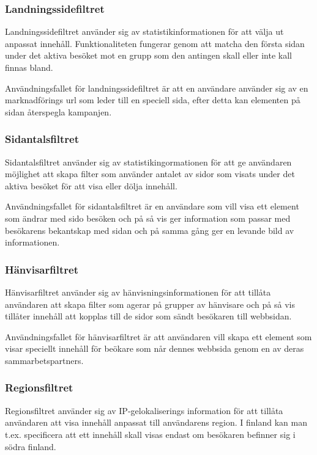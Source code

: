 \subsubsection{Landningssidefiltret}

Landningssidefiltret använder sig av statistikinformationen för att välja ut anpassat innehåll. Funktionaliteten fungerar genom att matcha den första sidan under det aktiva besöket mot en grupp som den antingen skall eller inte kall finnas bland.

Användningsfallet för landningssidefiltret är att en användare använder sig av en marknadförings url som leder till en speciell sida, efter detta kan elementen på sidan återspegla kampanjen.

\subsubsection{Sidantalsfiltret}

Sidantalsfiltret använder sig av statistikingormationen för att ge användaren möjlighet att skapa filter som använder antalet av sidor som visats under det aktiva besöket för att visa eller dölja innehåll.

Användningsfallet för sidantalsfiltret är en användare som vill visa ett element som ändrar med sido besöken och på så vis ger information som passar med besökarens bekantskap med sidan och på samma gång ger en levande bild av informationen.

\subsubsection{Hänvisarfiltret}

Hänvisarfiltret använder sig av hänvisningsinformationen för att tillåta användaren att skapa filter som agerar på grupper av hänvisare och på så vis tillåter innehåll att kopplas till de sidor som sändt besökaren till webbsidan.

Användningsfallet för hänvisarfiltret är att användaren vill skapa ett element som visar speciellt innehåll för beökare som når dennes webbsida genom en av deras sammarbetspartners.

\subsubsection{Regionsfiltret}

Regionsfiltret använder sig av IP-gelokaliserings information för att tillåta användaren att visa innehåll anpassat till användarens region. I finland kan man t.ex. specificera att ett innehåll skall visas endast om besökaren befinner sig i södra finland.


